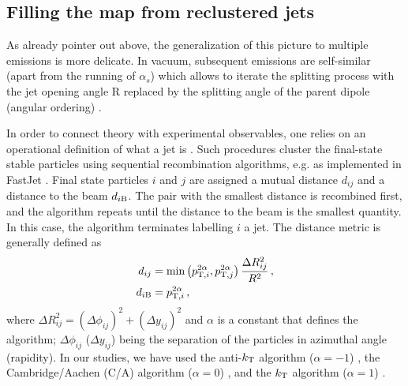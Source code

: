 

\subsection{Filling the map from reclustered jets}
\label{sec:iterative-declustering}

As already pointer out above, the generalization of this picture to multiple emissions is more delicate. In vacuum, subsequent emissions are self-similar (apart from the running of $\alpha_s$) which allows to iterate the splitting process with the jet opening angle R replaced by the splitting angle of the parent dipole (angular ordering) \cite{Ellis:1991qj,Dokshitzer:1991wu}. 

In order to connect theory with experimental observables, one relies on an operational definition of what a jet is \cite{Salam:2009jx}. Such procedures cluster the final-state stable particles using sequential recombination algorithms, e.g. as implemented in FastJet \cite{Cacciari:2005hq,Cacciari:2011ma}. Final state particles $i$ and $j$ are assigned a mutual distance $d_{ij}$ and a distance to the beam $d_{i\rm B}$. The pair with the smallest distance is recombined first, and the algorithm repeats until the distance to the beam is the smallest quantity. In this case, the algorithm terminates labelling $i$ a jet. The distance metric is generally defined as
\begin{align}
\label{eq:JetDistanceMetric}
d_{ij} &= \min\left(p_{{\rm \tiny T},i}^{2\alpha},p_{{\rm \tiny T},j}^{2\alpha} \right) \frac{\Delta R_{ij}^2}{R^2} \,, \\
d_{i \rm B} &= p_{{\rm \tiny T},i}^{2\alpha} \,,
\end{align}
where $\Delta R_{ij}^2 = (\Delta \phi_{ij})^2 + (\Delta y_{ij})^2$ and $\alpha$ is a constant that defines the algorithm; $\Delta \phi_{ij}$ ($\Delta y_{ij}$) being the separation of the particles in azimuthal angle (rapidity). In our studies, we have used the anti-$k_{\rm \tiny T}$ algorithm ($\alpha = -1$) \cite{Cacciari:2008gp}, the Cambridge/Aachen (C/A) algorithm ($\alpha = 0$) \cite{Dokshitzer:1997in,Wobisch:1998wt}, and the $k_{\rm \tiny T}$ algorithm ($\alpha = 1$) \cite{Catani:1993hr,Ellis:1993tq}.

